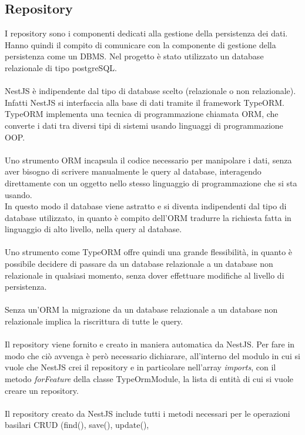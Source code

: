 \subsection{Repository}
I repository sono i componenti dedicati alla gestione della persistenza dei dati. Hanno quindi il compito di
comunicare con la componente di gestione della persistenza come un \gls{DBMS}\glsfirstoccur. Nel progetto è stato utilizzato un database
relazionale di tipo postgreSQL.
\\\\
NestJS è indipendente dal tipo di database scelto (relazionale o non relazionale). Infatti NestJS si interfaccia
alla base di dati tramite il framework TypeORM. TypeORM implementa una tecnica di programmazione chiamata 
\gls{ORM}\glsfirstoccur, che converte i dati tra diversi tipi di sistemi usando linguaggi di programmazione \gls{OOP}\glsfirstoccur.
\\\\
Uno strumento \gls{ORM} incapsula il codice necessario per manipolare i dati, senza aver bisogno di scrivere manualmente
le query al database, interagendo direttamente con un oggetto nello stesso linguaggio di programmazione che si sta usando. 
\\
In questo modo il database viene astratto e si diventa indipendenti dal tipo di database utilizzato, in quanto è compito dell'\gls{ORM}
tradurre la richiesta fatta in linguaggio di alto livello, nella query al database. 
\\\\
Uno strumento come TypeORM offre quindi una grande flessibilità, in quanto è possibile decidere di passare da un database
relazionale a un database non relazionale in qualsiasi momento, senza dover effettuare modifiche al livello di persistenza.
\\\\
Senza un'\gls{ORM} la migrazione da un database relazionale a un database non relazionale implica la riscrittura di tutte le query.
\\\\
Il repository viene fornito e creato in maniera automatica da NestJS. Per fare in modo che ciò avvenga è però necessario
dichiarare, all'interno del modulo in cui si vuole che NestJS crei il repository e in particolare nell'array \textit{imports}, con 
il metodo \textit{forFeature} della classe TypeOrmModule, la lista di entità di cui si vuole creare un repository.
\\\\
Il repository creato da NestJS include tutti i metodi necessari per le operazioni basilari \gls{CRUD} (find(), save(), update(), 
